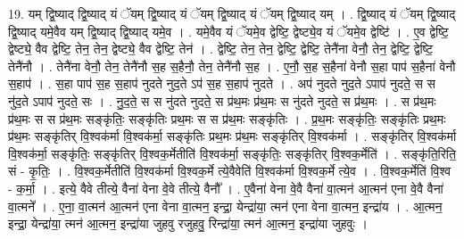 \documentclass[17pt]{extarticle}
\begin{document}
19. यम् द्वि॒ष्याद् द्वि॒ष्याद् यं ॅयम् द्वि॒ष्याद् यं ॅयम् द्वि॒ष्याद् यं ॅयम् द्वि॒ष्याद् यम् । . द्वि॒ष्याद् यं ॅयम् द्वि॒ष्याद् द्वि॒ष्याद् यमे॒वैव यम् द्वि॒ष्याद् द्वि॒ष्याद् यमे॒व । . यमे॒वैव यं ॅयमे॒व द्वेष्टि॒ द्वेष्ट्ये॒व यं ॅयमे॒व द्वेष्टि॑ । . ए॒व द्वेष्टि॒ द्वेष्ट्ये॒ वैव द्वेष्टि॒ तेन॒ तेन॒ द्वेष्ट्ये॒ वैव द्वेष्टि॒ तेन॑ । . द्वेष्टि॒ तेन॒ तेन॒ द्वेष्टि॒ द्वेष्टि॒ तेनै॑ना वेनौ॒ तेन॒ द्वेष्टि॒ द्वेष्टि॒ तेनै॑नौ । . तेनै॑ना वेनौ॒ तेन॒ तेनै॑नौ स॒ह स॒हैनौ॒ तेन॒ तेनै॑नौ स॒ह । . ए॒नौ॒ स॒ह स॒हैना॑ वेनौ स॒हा पाप॑ स॒हैना॑ वेनौ स॒हाप॑ । . स॒हा पाप॑ स॒ह स॒हाप॑ नुदते नुद॒ते ऽप॑ स॒ह स॒हाप॑ नुदते । . अप॑ नुदते नुद॒ते ऽपाप॑ नुदते॒ स स नु॑द॒ते ऽपाप॑ नुदते॒ सः । . नु॒द॒ते॒ स स नु॑दते नुदते॒ स प्र॑थ॒मः प्र॑थ॒मः स नु॑दते नुदते॒ स प्र॑थ॒मः । . स प्र॑थ॒मः प्र॑थ॒मः स स प्र॑थ॒मः सङ्कृ॑तिः॒ सङ्कृ॑तिः प्रथ॒मः स स प्र॑थ॒मः सङ्कृ॑तिः । . प्र॒थ॒मः सङ्कृ॑तिः॒ सङ्कृ॑तिः प्रथ॒मः प्र॑थ॒मः सङ्कृ॑तिर् वि॒श्वक॑र्मा वि॒श्वक॑र्मा॒ सङ्कृ॑तिः प्रथ॒मः प्र॑थ॒मः सङ्कृ॑तिर् वि॒श्वक॑र्मा । . सङ्कृ॑तिर् वि॒श्वक॑र्मा वि॒श्वक॑र्मा॒ सङ्कृ॑तिः॒ सङ्कृ॑तिर् वि॒श्वक॒र्मेतीति॑ वि॒श्वक॑र्मा॒ सङ्कृ॑तिः॒ सङ्कृ॑तिर् वि॒श्वक॒र्मेति॑ । . सङ्कृ॑ति॒रिति॒ सं - कृ॒तिः॒ । . वि॒श्वक॒र्मेतीति॑ वि॒श्वक॑र्मा वि॒श्वक॒र्मे त्ये॒वैवेति॑ वि॒श्वक॑र्मा वि॒श्वक॒र्मे त्ये॒व । . वि॒श्वक॒र्मेति॑ वि॒श्व - क॒र्मा॒ । . इत्ये॒ वैवे तीत्ये॒ वैना॑ वेना वे॒वे तीत्ये॒ वैनौ᳚ । . ए॒वैना॑ वेना वे॒वै वैना॑ वा॒त्मन॑ आ॒त्मन॑ एना वे॒वै वैना॑ वा॒त्मने᳚ । . ए॒ना॒ वा॒त्मन॑ आ॒त्मन॑ एना वेना वा॒त्मन॒ इन्द्रा॒ येन्द्रा॑या॒ त्मन॑ एना वेना वा॒त्मन॒ इन्द्रा॑य । . आ॒त्मन॒ इन्द्रा॒ येन्द्रा॑या॒ त्मन॑ आ॒त्मन॒ इन्द्रा॑या जुहवु रजुहवु॒ रिन्द्रा॑या॒ त्मन॑ आ॒त्मन॒ इन्द्रा॑या जुहवुः । \newline
\end{document}
